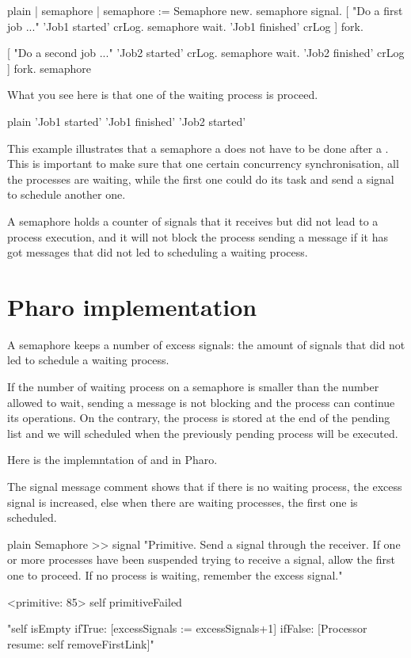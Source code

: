 \documentclass[10pt,twoside,english]{_support/latex/sbabook/sbabook}
\begin{document}
\begin{displaycode}{plain}
| semaphore |
semaphore := Semaphore new.
semaphore signal. 
[ "Do a first job ..."
	'Job1 started' crLog.
	semaphore wait. 
	'Job1 finished' crLog
	] fork.

[ "Do a second job ..."
	'Job2 started' crLog.
	semaphore wait. 
	'Job2 finished' crLog
	] fork.
semaphore
\end{displaycode}

What you see here is that one of the waiting process is proceed.

\begin{displaycode}{plain}
'Job1 started'
'Job1 finished'
'Job2 started'
\end{displaycode}

This example illustrates that a semaphore a  does not have to be done after a .
This is important to make sure that one certain concurrency synchronisation, all the processes are waiting, while the first one could do its task and send a signal to schedule another one. 

A semaphore holds a counter of signals that it receives but did not lead to a process execution, and it will not block the process sending a  message if it has got   messages that did not led to scheduling a waiting process.
\section{Pharo implementation }
A semaphore keeps a number of excess signals: the amount of signals that did not led to schedule a waiting process.

If the number of waiting process on a semaphore is smaller than the number allowed to wait, sending a  message is not blocking and the process can continue its operations. On the contrary, the process is stored at the end of the pending list and we will scheduled when the previously pending process will be executed. 

Here is the implemntation of  and  in Pharo.

The signal message comment shows that if there is no waiting process, the excess signal is increased, else when there are waiting processes, the first one is scheduled.

\begin{displaycode}{plain}
Semaphore >> signal
	"Primitive. Send a signal through the receiver. If one or more processes 
	have been suspended trying to receive a signal, allow the first one to 
	proceed. If no process is waiting, remember the excess signal."

	<primitive: 85>
	self primitiveFailed

	"self isEmpty    
		ifTrue: [excessSignals := excessSignals+1]    
		ifFalse: [Processor resume: self removeFirstLink]"
\end{displaycode}
\end{document}

